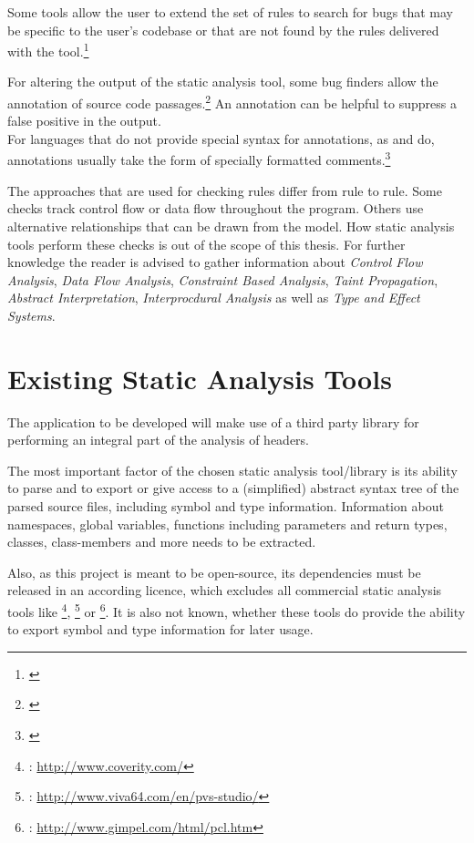 Some tools allow the user to extend the set of rules to search for bugs that may be specific to the user's codebase or that are not found by the rules delivered with the tool.\footnote{\citep[97]{SecureProgramming}}

For altering the output of the static analysis tool, some bug finders allow the annotation of source code passages.\footnote{\citep[99]{SecureProgramming}} An annotation can be helpful to suppress a false positive in the output.
\\For languages that do not provide special syntax for annotations, as  and  do, annotations usually
take the form of specially formatted comments.\footnote{\citep[99]{SecureProgramming}}

The approaches that are used for checking rules differ from rule to rule. Some checks track control flow or data flow throughout the program. Others use alternative \linebreak relationships that can be drawn from the model. How static analysis tools perform these checks is out of the scope of this thesis. For further knowledge the reader is advised to gather information about \textit{Control Flow Analysis}, \textit{Data Flow Analysis}, \textit{Constraint Based Analysis}, \textit{Taint Propagation}, \textit{Abstract Interpretation}, \textit{Interprocdural Analysis }as well as \textit{Type and Effect Systems}. 

\section{Existing Static Analysis Tools}

The application to be developed will make use of a third party library for performing an integral part of the analysis of  headers. 

The most important factor of the chosen static analysis tool/library is its ability to parse  and to export or give access to a (simplified) abstract syntax tree of the parsed source files, including symbol and type information. Information about namespaces, global variables, functions including parameters and return types, classes, class-members and more needs to be extracted.

Also, as this project is meant to be open-source, its dependencies must be released in an according licence, which excludes all commercial static analysis tools like \footnote{: \url{http://www.coverity.com/}}, \footnote{: \url{http://www.viva64.com/en/pvs-studio/}} or \footnote{: \url{http://www.gimpel.com/html/pcl.htm}}. It is also not known, whether these tools do provide the ability to export symbol and type information for later usage.

